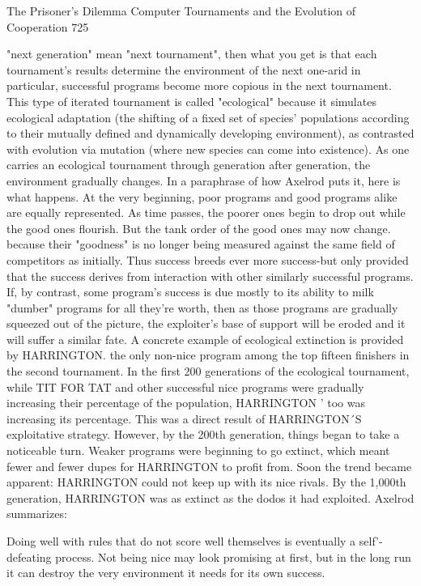 The Prisoner's Dilemma Computer Tournaments and the Evolution of Cooperation             725

"next generation" mean "next tournament", then what you get is that each tournament's
results determine the environment of the next one-arid in particular, successful programs
become more copious in the next tournament. This type of iterated tournament is called
"ecological" because it simulates ecological adaptation (the shifting of a fixed set of
species' populations according to their mutually defined and dynamically developing
environment), as contrasted with evolution via mutation (where new species can come
into existence).
        As one carries an ecological tournament through generation after generation, the
environment gradually changes. In a paraphrase of how Axelrod puts it, here is what
happens. At the very beginning, poor programs and good programs alike are equally
represented. As time passes, the poorer ones begin to drop out while the good ones
flourish. But the tank order of the good ones may now change. because their "goodness"
is no longer being measured against the same field of competitors as initially. Thus
success breeds ever more success-but only provided that the success derives from
interaction with other similarly successful programs. If, by contrast, some program's
success is due mostly to its ability to milk "dumber" programs for all they're worth, then
as those programs are gradually squeezed out of the picture, the exploiter's base of
support will be eroded and it will suffer a similar fate.
        A concrete example of ecological extinction is provided by HARRINGTON. the
only non-nice program among the top fifteen finishers in the second tournament. In the
first 200 generations of the ecological tournament, while TIT FOR TAT and other
successful nice programs were gradually increasing their percentage of the population,
HARRINGTON ' too was increasing its percentage. This was a direct result of
HARRINGTON´S exploitative strategy. However, by the 200th generation, things began
to take a noticeable turn. Weaker programs were beginning to go extinct, which meant
fewer and fewer dupes for HARRINGTON to profit from. Soon the trend became
apparent: HARRINGTON could not keep up with its nice rivals. By the 1,000th
generation, HARRINGTON was as extinct as the dodos it had exploited. Axelrod
summarizes:

        Doing well with rules that do not score well themselves is eventually a self'-defeating
process. Not being nice may look promising at first, but in the long run it can destroy the very
environment it needs for its own success.

